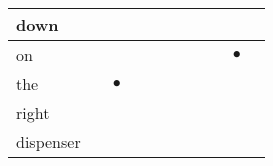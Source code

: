 \documentclass[landscape]{article}
\newcommand{\ssp}{\hspace{2pt}}
\newcommand{\mex}{\cellcolor{g}$\bullet$}
\begin{document}
\begin{tabular}{|l|p{10pt}|p{10pt}|p{10pt}|p{10pt}|p{10pt}|p{10pt}|p{10pt}|p{10pt}|p{10pt}|p{10pt}|}
\hline
\ssp down \ssp&\hspace{2pt}&\hspace{2pt}&\hspace{2pt}&\hspace{2pt}&\hspace{2pt}&\hspace{2pt}&\hspace{2pt}&\hspace{2pt}&\hspace{2pt}&\hspace{2pt}\\
\hline
\ssp \cellcolor{ref8}on \ssp&\hspace{2pt}&\hspace{2pt}&\hspace{2pt}&\hspace{2pt}&\hspace{2pt}&\hspace{2pt}&\hspace{2pt}&\hspace{2pt}&\hspace{2pt}\mex&\hspace{2pt}\\
\hline
\ssp \cellcolor{ref1}the \ssp&\hspace{2pt}&\hspace{2pt}\mex&\hspace{2pt}&\hspace{2pt}&\hspace{2pt}&\hspace{2pt}&\hspace{2pt}&\hspace{2pt}&\hspace{2pt}&\hspace{2pt}\\
\hline
\ssp right \ssp&\hspace{2pt}&\hspace{2pt}&\hspace{2pt}&\hspace{2pt}&\hspace{2pt}&\hspace{2pt}&\hspace{2pt}&\hspace{2pt}&\hspace{2pt}&\hspace{2pt}\\
\hline
\ssp dispenser \ssp&\hspace{2pt}&\hspace{2pt}&\hspace{2pt}&\hspace{2pt}&\hspace{2pt}&\hspace{2pt}&\hspace{2pt}&\hspace{2pt}&\hspace{2pt}&\hspace{2pt}\\

\end{tabular}
\end{document}

